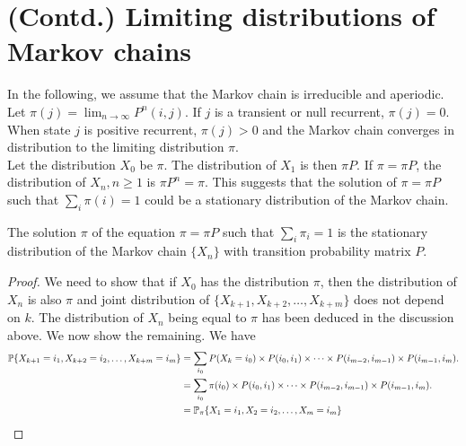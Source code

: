 \documentclass[all-lectures.tex]{subfiles}
\begin{document}

\setcounter{section}{1}
\setcounter{subsection}{0}

\section*{}
\chr
\section{(Contd.) Limiting distributions of Markov chains}
In the following, we assume that the Markov chain is irreducible and aperiodic. \\
\indent Let $\pi(j) = \lim_{n\rightarrow \infty} P^n(i,j)$. If $j$ is a transient or null recurrent, $\pi(j) = 0$. When state $j$ is positive recurrent, $\pi(j) > 0$ and the Markov chain converges in distribution to the limiting distribution $\pi$. \\
\indent Let the distribution $X_0$ be $\pi$. The distribution of $X_1$ is then $\pi P$. If $\pi = \pi P$, the distribution of $X_n, n \geq 1$ is $\pi P^n = \pi$. This suggests that the solution of $\pi = \pi P$ such that $\sum_i \pi(i) = 1$ could be a stationary distribution of the Markov chain.
\begin{prop}
The solution $\pi$ of the equation $\pi = \pi P$ such that $\sum_i \pi_i = 1$ is the stationary distribution of the Markov chain $\{X_n\}$ with transition probability matrix $P$.
\begin{proof}
We need to show that if $X_0$ has the distribution $\pi$, then the distribution of $X_n$ is also $\pi$ and joint distribution of $\{X_{k+1},X_{k+2},\dots,X_{k+m}\}$ does not depend on $k$. The distribution of $X_n$ being equal to $\pi$ has been deduced in the discussion above. We now show the remaining. We have 
\begin{align*}
\P\{X_{k+1} = i_1,X_{k+2} = i_2,\dots,X_{k+m} = i_m\} &= \sum_{i_0} P(X_{k} = i_0) \times P(i_{0},i_{1}) \times \dots \times P(i_{m-2},i_{m-1}) \times P(i_{m-1},i_{m}) . \\
&= \sum_{i_0} \pi(i_0) \times P(i_{0},i_{1}) \times \dots  \times P(i_{m-2},i_{m-1}) \times P(i_{m-1},i_{m}). \\
&= \P_{\pi}\{X_{1} = i_1,X_{2} = i_2,\dots,X_{m} = i_m\} 
\end{align*}
\end{proof}
\end{prop}
\end{document}
